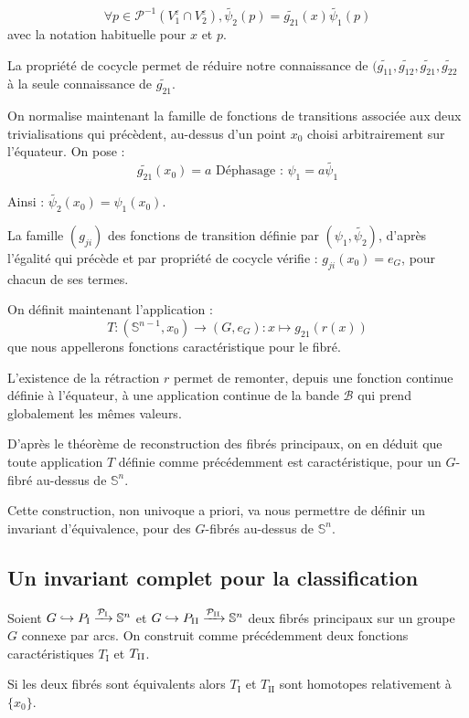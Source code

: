 \[\forall p \in \mathcal{P}^{-1}(V_1^{\varepsilon} \cap V_2^{\varepsilon}) , \tilde{\psi_2}(p) = \tilde{g_{21}}(x) \tilde{\psi_1}(p)\]
avec la notation habituelle pour $x$ et $p$.

\par
La propriété de cocycle permet de réduire notre connaissance de $(\tilde{g_{11}},\tilde{g_{12}},\tilde{g_{21}},\tilde{g_{22}}$ à la seule connaissance de $\tilde{g_{21}}$.

\par
On normalise maintenant la famille de fonctions de transitions associée aux deux trivialisations qui précèdent, %
au-dessus d'un point $x_0$ choisi arbitrairement sur l'équateur. On pose :
\[\tilde{g_{21}}(x_0) = a\text{ Déphasage : }\psi_1 = a \tilde{\psi_1}\]

Ainsi : $\tilde{\psi_2}(x_0) = \psi_1(x_0)$.

La famille $(g_{ji})$ des fonctions de transition définie par $(\psi_1,\tilde{\psi_2})$, %
d'après l'égalité qui précède et par propriété de cocycle vérifie : $g_{ji}(x_0) = e_G$, pour chacun de ses termes.

\par
On définit maintenant l'application :
\[T : (\mathbb{S}^{n-1},x_0) \rightarrow (G,e_G) : x \mapsto g_{21}(r(x))\]
que nous appellerons fonctions caractéristique pour le fibré.

L'existence de la rétraction $r$ permet de remonter, depuis une fonction continue définie à l'équateur, %
à une application continue de la bande $\mathcal{B}$ qui prend globalement les mêmes valeurs.

\par
D'après le théorème de reconstruction des fibrés principaux, %
on en déduit que toute application $T$ définie comme précédemment est caractéristique, pour un $G$-fibré au-dessus de $\mathbb{S}^n$.

\par
Cette construction, non univoque a priori, va nous permettre de définir un invariant d'équivalence, pour des $G$-fibrés au-dessus de $\mathbb{S}^n$.

\subsection{Un invariant complet pour la classification}

\begin{theo}\label{tinv}
Soient $G \hookrightarrow P_{\text{I}} \xrightarrow{\mathcal{P}_{\text{I}}} \mathbb{S}^n$ et $G \hookrightarrow P_{\text{II}} \xrightarrow{\mathcal{P}_{\text{II}}} \mathbb{S}^n$ %
deux fibrés principaux sur un groupe $G$ connexe par arcs. %
On construit comme précédemment deux fonctions caractéristiques $T_\text{I}$ et $T_{\text{II}}$.
\par
Si les deux fibrés sont équivalents alors $T_\text{I}$ et $T_{\text{II}}$ sont homotopes relativement à $\{x_0\}$.
\end{theo}

